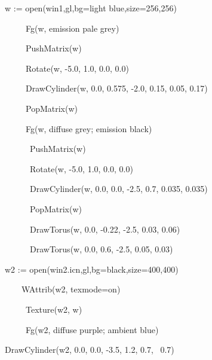 \documentclass[letterpaper]{article}
\begin{document}
\bigskip


\bigskip

{\sffamily
w := open({\textquotedbl}win1{\textquotedbl},{\textquotedbl}gl{\textquotedbl},{\textquotedbl}bg=light
blue{\textquotedbl},{\textquotedbl}size=256,256{\textquotedbl})}

{\sffamily
\ \ \ \ \ Fg(w, {\textquotedbl}emission pale grey{\textquotedbl})}

{\sffamily
\ \ \ \ \ PushMatrix(w)}

{\sffamily
\ \ \ \ \ Rotate(w, -5.0, 1.0, 0.0, 0.0)}

{\sffamily
\ \ \ \ \ DrawCylinder(w, 0.0, 0.575, -2.0, 0.15, 0.05, 0.17)}

{\sffamily
\ \ \ \ \ PopMatrix(w) \ }

{\sffamily
\ \ \ \ \ Fg(w, {\textquotedbl}diffuse grey; emission black{\textquotedbl})}

{\sffamily
\ \ \ \ \ \ PushMatrix(w)}

{\sffamily
\ \ \ \ \ \ Rotate(w, -5.0, 1.0, 0.0, 0.0)}

{\sffamily
\ \ \ \ \ \ DrawCylinder(w, 0.0, 0.0, -2.5, 0.7, 0.035, 0.035)}

{\sffamily
\ \ \ \ \ \ PopMatrix(w) \ \ \ \ \ \ \ \ \ \ \ \ \ \ }

{\sffamily
\ \ \ \ \ \ DrawTorus(w, 0.0, -0.22, -2.5, 0.03, 0.06)}

{\sffamily
\ \ \ \ \ \ DrawTorus(w, 0.0, 0.6, -2.5, 0.05, 0.03)}


\bigskip

{\sffamily
w2 :=
open({\textquotedbl}win2.icn{\textquotedbl},{\textquotedbl}gl{\textquotedbl},{\textquotedbl}bg=black{\textquotedbl},{\textquotedbl}size=400,400{\textquotedbl})}

{\sffamily
\ \ \ \ WAttrib(w2, {\textquotedbl}texmode=on{\textquotedbl})}

{\sffamily
\ \ \ \ \ Texture(w2, w) }

{\sffamily
\ \ \ \ \ Fg(w2, {\textquotedbl}diffuse purple; ambient blue{\textquotedbl}) \ }

{\sffamily
DrawCylinder(w2, 0.0, 0.0, -3.5, 1.2, 0.7, \ 0.7)}
\end{document}
